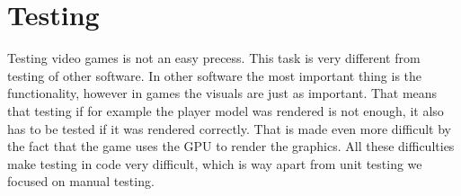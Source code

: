 \chapter{Testing} \label{sec:testing}
Testing video games is not an easy precess.
This task is very different from testing of other software.
In other software the most important thing is the functionality, however in games the visuals are just as important.
That means that testing if for example the player model was rendered is not enough, it also has to be tested if it was rendered correctly.
That is made even more difficult by the fact that the game uses the GPU to render the graphics.
All these difficulties make testing in code very difficult, which is way apart from unit testing we focused on manual testing.


